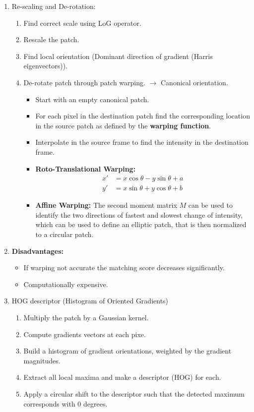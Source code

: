 \documentclass[10pt,a4paper]{scrartcl}
\begin{document}
\begin{multicols*}{2}
\begin{enumerate}
\item Re-scaling and De-rotation:
\begin{enumerate}
\item Find correct scale using LoG operator.
\item Rescale the patch.
\item Find local orientation (Dominant direction of gradient (Harris eigenvectors)).
\item De-rotate patch through patch warping. $\rightarrow$ Canonical orientation.
\begin{itemize}
\item Start with an empty canonical patch.
\item For each pixel in the destination patch find the corresponding location in the source patch as defined by the \textbf{warping function}.
\item Interpolate in the source frame to find the intensity in the destination frame.
\item \textbf{Roto-Translational Warping:} \begin{align*}
x'&=x\cos\theta-y\sin\theta+a\\y'&=x\sin\theta+y\cos\theta+b
\end{align*}
\item \textbf{Affine Warping:} The second moment matrix $M$ can be used to identify the two directions of fastest and slowest change of intensity, which can be used to define an elliptic patch, that is then normalized to a circular patch.
\end{itemize}
\end{enumerate}
\item \textbf{Disadvantages:}
\begin{itemize}
\item If warping not accurate the matching score decreases significantly.
\item Computationally expensive.
\end{itemize}
\item HOG descriptor (Histogram of Oriented Gradients)
\begin{enumerate}
\item Multiply the patch by a Gaussian kernel.
\item Compute gradients vectors at each pixe.
\item Build a histogram of gradient orientations, weighted by the gradient magnitudes.
\item Extract all local maxima and make a descriptor (HOG) for each.
\item Apply a circular shift to the descriptor such that the detected maximum corresponds with $0$ degrees.


\end{enumerate}
\end{enumerate}
\end{multicols*}
\end{document}

